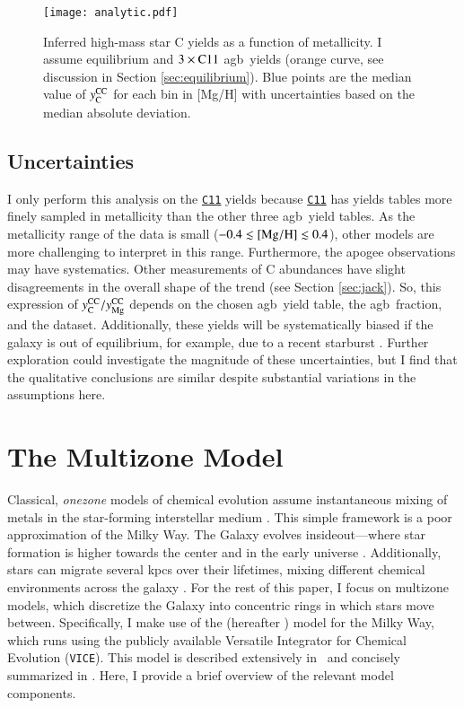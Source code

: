 \documentclass[12pt,oneside,letterpaper]{report}
\newcommand{\agb}{\gls{agb}}
\newcommand{\apogee}{\gls{apogee}}
\newcommand{\cxi}{\texttt{\hyperlink{C11}{C11}}}
\newcommand{\JJ}{\citetalias{james+21}}
\newcommand{\VICE}{\texttt{VICE}}
\newcommand{\Ycc}{\ensuremath{y_{\rm C}^{\rm CC}}}
\newcommand{\Yoc}{\ensuremath{y_{\rm Mg}^{\rm CC}}}
\begin{document}
\begin{figure}[htp]
    \centering
    \texttt{[image: analytic.pdf]}
    \caption[Reverse-Fit Yields]{Inferred high-mass star C yields as a function of metallicity. I assume equilibrium and $3\times {\rm C11}$ \agb\ yields (orange curve, see discussion in Section \ref{sec:equilibrium}). Blue points are the median value of $\Ycc$ for each bin in [Mg/H] with uncertainties based on the median absolute deviation.
    }
    \label{fig:analytic}
\end{figure}





\section{Uncertainties}

I only perform this analysis on the \cxi{} yields because \cxi{} has yields tables more finely sampled in metallicity than the other three \agb\ yield tables. As the metallicity range of the data is small ($-0.4\lesssim {\rm [Mg/H]} \lesssim 0.4$), other models are more challenging to interpret in this range. Furthermore, the \apogee{} observations may have systematics. Other measurements of C abundances \citep[e.g.][]{vincenzo+21} have slight disagreements in the overall shape of the trend (see Section \ref{sec:jack}).
So, this expression of $\Ycc/\Yoc$ depends on the chosen \agb\ yield table, the \agb\ fraction, and the dataset. 
Additionally, these yields will be systematically biased if the galaxy is out of equilibrium, for example, due to a recent starburst \citep{mor+19,isern19}. Further exploration could investigate the magnitude of these uncertainties, but I find that the qualitative conclusions are similar despite substantial variations in the assumptions here.



\chapter{The Multizone Model}\label{sec:vice}

Classical, \textit{\gls{onezone}} models of chemical evolution assume instantaneous mixing of metals in the star-forming interstellar medium \citep[e.g.][]{matteucci21}. This simple framework is a poor approximation of the Milky Way.  The Galaxy evolves \gls{insideout}---where star formation is higher towards the center and in the early universe \citep{bird+13}. Additionally, stars can migrate several kpcs over their lifetimes, mixing different chemical environments across the galaxy \citep{bird+12,sellwood+binney02}. For the rest of this paper, I focus on \gls{multizone} models, which discretize the Galaxy into concentric rings in which stars move between.  Specifically, I make use of the \citet{james+21} (hereafter \JJ) model for the Milky Way, which runs using the publicly available Versatile Integrator for Chemical Evolution (\VICE). This model is described extensively in \JJ~and concisely summarized  in \citet{james+23}. Here, I provide a brief overview of the relevant model components.
\end{document}
